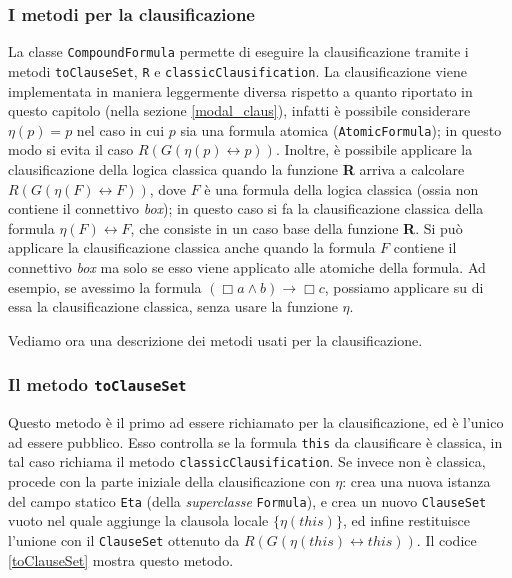 \documentclass[a4paper,12pt]{report}
\newcommand{\tto} {\leftrightarrow}
\begin{document}
\subsubsection{I metodi per la clausificazione}
La classe \texttt{CompoundFormula} permette di eseguire la clausificazione tramite i metodi \texttt{toClauseSet}, \texttt{R} e \texttt{classicClausification}. La clausificazione viene implementata in maniera leggermente diversa rispetto a quanto riportato in questo capitolo (nella sezione \ref{modal_claus}), infatti è possibile considerare $\eta(p) = p$ nel caso in cui $p$ sia una formula atomica (\texttt{AtomicFormula}); in questo modo si evita il caso $R(G(\eta(p) \tto p))$. Inoltre, è possibile applicare la clausificazione della logica classica quando la funzione \textbf{R} arriva a calcolare $R(G(\eta(F) \tto F))$, dove $F$ è una formula della logica classica (ossia non contiene il connettivo \emph{box}); in questo caso si fa la clausificazione classica della formula $\eta(F) \tto F$, che consiste in un caso base della funzione \textbf{R}. Si può applicare la clausificazione classica anche quando la formula $F$ contiene il connettivo \emph{box} ma solo se esso viene applicato alle atomiche della formula. Ad esempio, se avessimo la formula $(\Box a \land b) \to \Box c$, possiamo applicare su di essa la clausificazione classica, senza usare la funzione $\eta$.

Vediamo ora una descrizione dei metodi usati per la clausificazione.

\subsubsection{Il metodo \texttt{toClauseSet}}
Questo metodo è il primo ad essere richiamato per la clausificazione, ed è l'unico ad essere pubblico. Esso controlla se la formula \texttt{this} da clausificare è classica, in tal caso richiama il metodo \texttt{classicClausification}. Se invece non è classica, procede con la parte iniziale della clausificazione con $\eta$: crea una nuova istanza del campo statico \texttt{Eta} (della \emph{superclasse} \texttt{Formula}), e crea un nuovo \texttt{ClauseSet} vuoto nel quale aggiunge la clausola locale $\{\eta(this)\}$, ed infine restituisce l'unione con il \texttt{ClauseSet} ottenuto da $R(G(\eta(this) \tto this))$. Il codice \ref{toClauseSet} mostra questo metodo.
\end{document}
